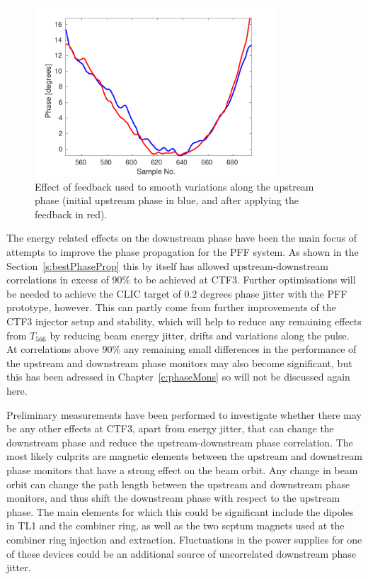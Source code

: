 \begin{figure}
  \centering
  \includegraphics[width=0.8\textwidth]{Figures/propagation/beforeAfterDavideFlatten}
  \caption{Effect of feedback used to smooth variations along the upstream phase (initial upstream phase in blue, and after applying the feedback in red).}
  \label{f:beforeAfterDavideFlatten}
\end{figure}


The energy related effects on the downstream phase have been the main focus of attempts to improve the phase propagation for the PFF system. As shown in the Section~\ref{s:bestPhaseProp} this by itself has allowed upstream-downstream correlations in excess of 90\% to be achieved at CTF3. Further optimisations will be needed to achieve the CLIC target of 0.2 degrees phase jitter with the PFF prototype, however. This can partly come from further improvements of the CTF3 injector setup and stability, which will help to reduce any remaining effects from \(T_{566}\) by reducing beam energy jitter, drifts and variations along the pulse. At correlations above \(90\%\) any remaining small differences in the performance of the upstream and downstream phase monitors may also become significant, but this has been adressed in Chapter~\ref{c:phaseMons} so will not be discussed again here.

Preliminary measurements have been performed to investigate whether there may be any other effects at CTF3, apart from energy jitter, that can change the downstream phase and reduce the upstream-downstream phase correlation. The most likely culprits are magnetic elements between the upstream and downstream phase monitors that have a strong effect on the beam orbit. Any change in beam orbit can change the path length between the upstream and downstream phase monitors, and thus shift the downstream phase with respect to the upstream phase. The main elements for which this could be significant include the dipoles in TL1 and the combiner ring, as well as the two septum magnets used  at the combiner ring injection and extraction. Fluctuations in the power supplies for one of these devices could be an additional source of uncorrelated downstream phase jitter.

